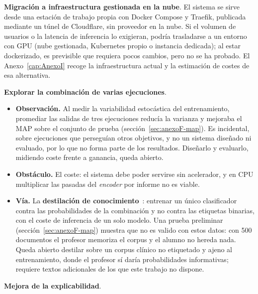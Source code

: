\textbf{Migración a infraestructura gestionada en la nube}. El sistema se sirve desde una estación de trabajo propia con Docker Compose y Traefik, publicada mediante un túnel de Cloudflare, sin proveedor en la nube. Si el volumen de usuarios o la latencia de inferencia lo exigieran, podría trasladarse a un entorno con GPU (nube gestionada, Kubernetes propio o instancia dedicada); al estar dockerizado, es previsible que requiera pocos cambios, pero no se ha probado. El Anexo~\ref{cap:AnexoI} recoge la infraestructura actual y la estimación de costes de esa alternativa.

\textbf{Explorar la combinación de varias ejecuciones}.

\begin{itemize}
 \item \textbf{Observación.} Al medir la variabilidad estocástica del entrenamiento, promediar las salidas de tres ejecuciones reducía la varianza y mejoraba el MAP sobre el conjunto de prueba (sección~\ref{sec:anexoF-map}). Es incidental, sobre ejecuciones que perseguían otros objetivos, y no un sistema diseñado ni evaluado, por lo que no forma parte de los resultados. Diseñarlo y evaluarlo, midiendo coste frente a ganancia, queda abierto.
 \item \textbf{Obstáculo.} El coste: el sistema debe poder servirse sin acelerador, y en CPU multiplicar las pasadas del \emph{encoder} por informe no es viable.
 \item \textbf{Vía.} La \textbf{destilación de conocimiento}~\cite{hinton2015distilling}: entrenar un único clasificador contra las probabilidades de la combinación y no contra las etiquetas binarias, con el coste de inferencia de un solo modelo. Una prueba preliminar (sección~\ref{sec:anexoF-map}) muestra que no es valido con estos datos: con 500 documentos el profesor memoriza el corpus y el alumno no hereda nada. Queda abierto destilar sobre un corpus clínico no etiquetado y ajeno al entrenamiento, donde el profesor sí daría probabilidades informativas; requiere textos adicionales de los que este trabajo no dispone.
\end{itemize}

\textbf{Mejora de la explicabilidad}.

